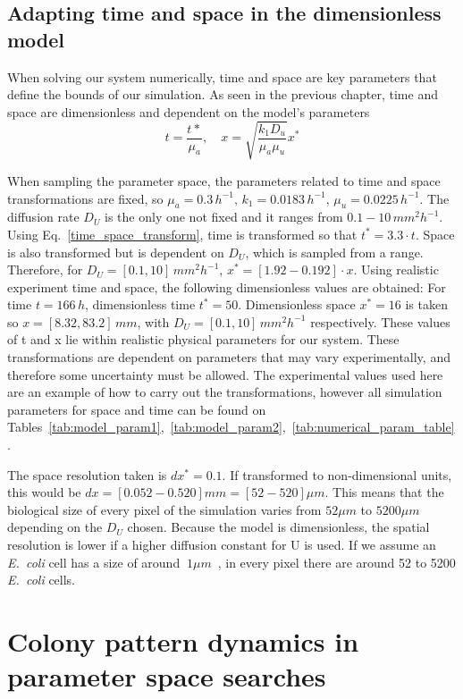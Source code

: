 \subsection{Adapting time and space in the dimensionless model}
When solving our system numerically, time and space are key parameters that define the bounds of our simulation.
As seen in the previous chapter, time and space are dimensionless and dependent on the model’s parameters
\begin{equation}\label{time_space_transform}
    t = \frac{t*}{\mu _a}, \quad x = \sqrt{\frac{k_{1}D_{u}}{\mu_{a}\mu_{u}}}x^*
\end{equation}

When sampling the parameter space, the parameters related to time and space transformations are fixed, so $\mu_a = 0.3 \,h^{-1}, \,k_1 = 0.0183 \,h^{-1},\, \mu_u = 0.0225\, h^{-1}$.
The diffusion rate $D_U$ is the only one not fixed and it ranges from $0.1-10 \,mm^2h^{-1}$.
Using Eq.~\ref{time_space_transform}, time is transformed so that $t^*=3.3\cdot t$.
Space is also transformed but is dependent on $D_U$, which is sampled from a range.
Therefore, for $D_U = [0.1, 10] \,mm^2 h^{-1}$, $x^* =[1.92 - 0.192] \cdot x$.
Using realistic experiment time and space, the following dimensionless values are obtained:
For time $t=166\,h$, dimensionless time $t^*=50$.
Dimensionless space  $x^*=16$ is taken so  $x = [8.32, 83.2] \,mm$, with $D_U = [0.1, 10]\, mm^2 h^{-1}$ respectively.
These values of t and x lie within realistic physical parameters for our system.
These transformations are dependent on parameters that may vary experimentally, and therefore some uncertainty must be allowed.
The experimental values used here are an example of how to carry out the transformations, however all simulation parameters for space and time can be found on Tables~\ref{tab:model_param1},~\ref{tab:model_param2},~\ref{tab:numerical_param_table}.

The space resolution taken is $dx^*=0.1$.
If transformed to non-dimensional units, this would be $dx =[0.052-0.520] mm = [52-520] \mu m$.
This means that the biological size of every pixel of the simulation varies from $52\mu m$ to $5200\mu m$ depending on the $D_{U}$ chosen.
Because the model is dimensionless, the spatial resolution is lower if a higher diffusion constant for U is used.
If we assume an \textit{E.~coli} cell has a size of around $~1\mu m$~\parencite{shiomi2009genetic}, in every pixel there are around 52 to 5200 \textit{E.~coli} cells.
\section{Colony pattern dynamics in parameter space searches}

